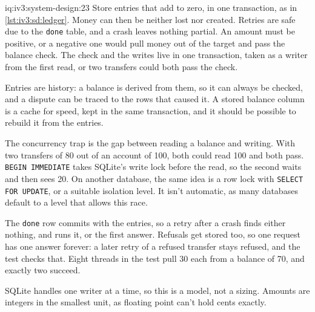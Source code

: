 \begin{solution}{iq:iv3:system-design:23}
Store entries that add to zero, in one transaction, as in \cref{lst:iv3:sd:ledger}. Money can then be neither lost nor created. Retries are safe due to the \texttt{done} table, and a crash leaves nothing partial. An amount must be positive, or a negative one would pull money out of the target and pass the balance check. The check and the writes live in one transaction, taken as a writer from the first read, or two transfers could both pass the check.
\label{lst:iv3:sd:ledger}

Entries are history: a balance is derived from them, so it can always be checked, and a dispute can be traced to the rows that caused it. A stored balance column is a cache for speed, kept in the same transaction, and it should be possible to rebuild it from the entries.

The concurrency trap is the gap between reading a balance and writing. With two transfers of 80 out of an account of 100, both could read 100 and both pass. \texttt{BEGIN IMMEDIATE} takes SQLite's write lock before the read, so the second waits and then sees 20. On another database, the same idea is a row lock with \texttt{SELECT FOR UPDATE}, or a suitable isolation level. It isn't automatic, as many databases default to a level that allows this race.

The \texttt{done} row commits with the entries, so a retry after a crash finds either nothing, and runs it, or the first answer. Refusals get stored too, so one request has one answer forever: a later retry of a refused transfer stays refused, and the test checks that. Eight threads in the test pull 30 each from a balance of 70, and exactly two succeed.

SQLite handles one writer at a time, so this is a model, not a sizing. Amounts are integers in the smallest unit, as floating point can't hold cents exactly.

\end{solution}

